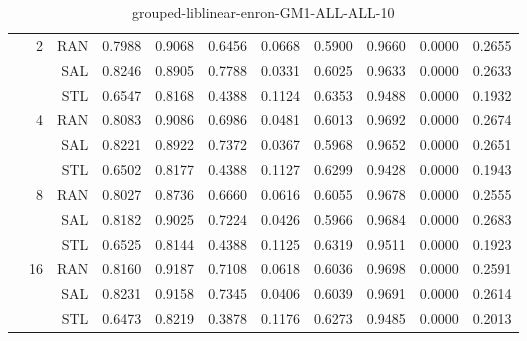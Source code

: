 \begin{center}
\begin{table}[htbp]
\begin{center}
\begin{tabular}{ | r | r | r | r | r | r | r | r | r | r | r |}
 & \multirow{3}{*}{2} & RAN & 0.7988 & 0.9068 & 0.6456 & 0.0668 & 0.5900 & 0.9660 & 0.0000 & 0.2655\\ \cline{3-11}
 &   & SAL & 0.8246 & 0.8905 & 0.7788 & 0.0331 & 0.6025 & 0.9633 & 0.0000 & 0.2633\\ \cline{3-11}
 &   & STL & 0.6547 & 0.8168 & 0.4388 & 0.1124 & 0.6353 & 0.9488 & 0.0000 & 0.1932\\ \cline{2-11}
 & \multirow{3}{*}{4} & RAN & 0.8083 & 0.9086 & 0.6986 & 0.0481 & 0.6013 & 0.9692 & 0.0000 & 0.2674\\ \cline{3-11}
 &   & SAL & 0.8221 & 0.8922 & 0.7372 & 0.0367 & 0.5968 & 0.9652 & 0.0000 & 0.2651\\ \cline{3-11}
 &   & STL & 0.6502 & 0.8177 & 0.4388 & 0.1127 & 0.6299 & 0.9428 & 0.0000 & 0.1943\\ \cline{2-11}
 & \multirow{3}{*}{8} & RAN & 0.8027 & 0.8736 & 0.6660 & 0.0616 & 0.6055 & 0.9678 & 0.0000 & 0.2555\\ \cline{3-11}
 &   & SAL & 0.8182 & 0.9025 & 0.7224 & 0.0426 & 0.5966 & 0.9684 & 0.0000 & 0.2683\\ \cline{3-11}
 &   & STL & 0.6525 & 0.8144 & 0.4388 & 0.1125 & 0.6319 & 0.9511 & 0.0000 & 0.1923\\ \cline{2-11}
 & \multirow{3}{*}{16} & RAN & 0.8160 & 0.9187 & 0.7108 & 0.0618 & 0.6036 & 0.9698 & 0.0000 & 0.2591\\ \cline{3-11}
 &   & SAL & 0.8231 & 0.9158 & 0.7345 & 0.0406 & 0.6039 & 0.9691 & 0.0000 & 0.2614\\ \cline{3-11}
 &   & STL & 0.6473 & 0.8219 & 0.3878 & 0.1176 & 0.6273 & 0.9485 & 0.0000 & 0.2013\\ \cline{2-11}
\hline
\end{tabular}
\caption{grouped-liblinear-enron-GM1-ALL-ALL-10}
\end{center}
 \end{table}
\end{center}

